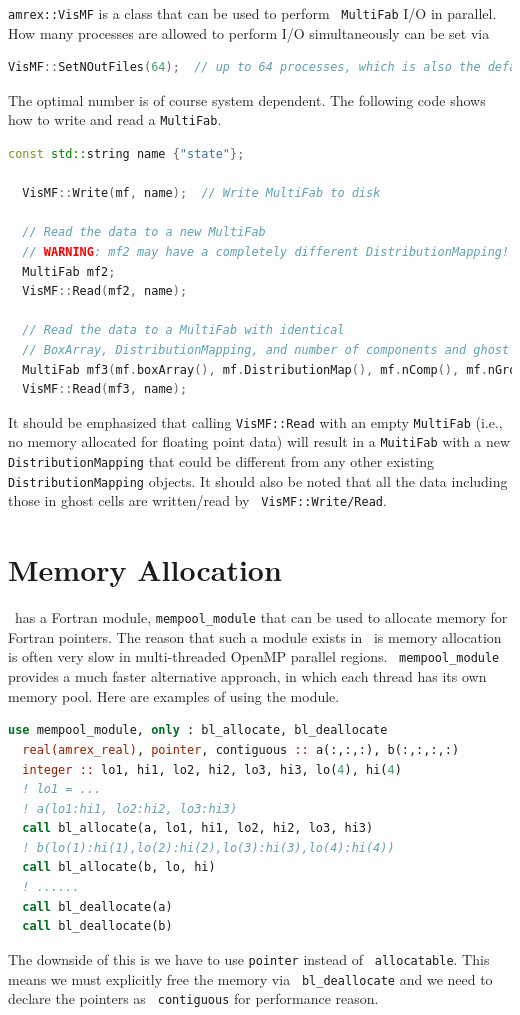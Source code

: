 {{{\tt amrex::VisMF} is a class that can be used to perform {\tt
  MultiFab} I/O in parallel.  How many processes are allowed to
perform I/O simultaneously can be set via
\begin{lstlisting}[language=cpp]
  VisMF::SetNOutFiles(64);  // up to 64 processes, which is also the default.
\end{lstlisting}
The optimal number is of course system dependent.  The following code
shows how to write and read a {\tt MultiFab}.
\begin{lstlisting}[language=cpp]
  const std::string name {"state"};

  VisMF::Write(mf, name);  // Write MultiFab to disk

  // Read the data to a new MultiFab
  // WARNING: mf2 may have a completely different DistributionMapping!
  MultiFab mf2;
  VisMF::Read(mf2, name);

  // Read the data to a MultiFab with identical
  // BoxArray, DistributionMapping, and number of components and ghost cells.
  MultiFab mf3(mf.boxArray(), mf.DistributionMap(), mf.nComp(), mf.nGrow());
  VisMF::Read(mf3, name);
\end{lstlisting}
It should be emphasized that calling {\tt VisMF::Read} with an empty
{\tt MultiFab} (i.e., no memory allocated for floating point data)
will result in a {\tt MuitiFab} with a new {\tt DistributionMapping}
that could be different from any other existing {\tt
DistributionMapping} objects.  It should also be noted that all the
data including those in ghost cells are written/read by {\tt
VisMF::Write/Read}. 

\section{Memory Allocation}

\amrex\ has a Fortran module, {\tt mempool\_module} that can be used to
allocate memory for Fortran pointers.  The reason that such a module
exists in \amrex\ is memory allocation is often very slow in
multi-threaded OpenMP parallel regions.  \amrex\ {\tt mempool\_module}
provides a much faster alternative approach, in which each thread has
its own memory pool.  Here are examples of using the module.
\begin{lstlisting}[language=fortran]
  use mempool_module, only : bl_allocate, bl_deallocate
  real(amrex_real), pointer, contiguous :: a(:,:,:), b(:,:,:,:)
  integer :: lo1, hi1, lo2, hi2, lo3, hi3, lo(4), hi(4)
  ! lo1 = ...
  ! a(lo1:hi1, lo2:hi2, lo3:hi3)
  call bl_allocate(a, lo1, hi1, lo2, hi2, lo3, hi3)
  ! b(lo(1):hi(1),lo(2):hi(2),lo(3):hi(3),lo(4):hi(4))
  call bl_allocate(b, lo, hi)
  ! ......
  call bl_deallocate(a)
  call bl_deallocate(b)
\end{lstlisting}
The downside of this is we have to use {\tt pointer} instead of {\tt
allocatable}.  This means we must explicitly free the memory via {\tt
bl\_deallocate} and we need to declare the pointers as {\tt
contiguous} for performance reason.

}}
